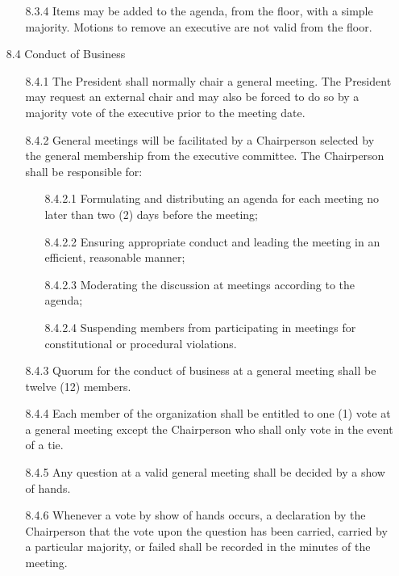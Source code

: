 \documentclass[12pt,a4paper]{article}
\begin{document}
\begin{enumerate}
\begin{enumerate}
\item[8.3.4] Items may be added to the agenda, from the floor, with a simple majority. Motions to remove an executive are not valid from the floor.
\end{enumerate}

\item[8.4] Conduct of Business

\begin{enumerate}
\item[8.4.1] The President shall normally chair a general meeting. The President may request an external chair and may also be forced to do so by a majority vote of the executive prior to the meeting date.  

\item[8.4.2] General meetings will be facilitated by a Chairperson selected by the general membership from the executive committee.
The Chairperson shall be responsible for:

\begin{enumerate}
\item[8.4.2.1] Formulating and distributing an agenda for each meeting no later than two (2) days before the meeting;

\item[8.4.2.2] Ensuring appropriate conduct and leading the meeting in an efficient, reasonable manner;

\item[8.4.2.3] Moderating the discussion at meetings according to the agenda;

\item[8.4.2.4] Suspending members from participating in meetings for constitutional or procedural violations.
\end{enumerate}

\item[8.4.3] Quorum for the conduct of business at a general meeting shall be twelve (12) members.

\item[8.4.4] Each member of the organization shall be entitled to one (1) vote at a general meeting except the
Chairperson who shall only vote in the event of a tie.

\item[8.4.5] Any question at a valid general meeting shall be decided by a show of hands.

\item[8.4.6] Whenever a vote by show of hands occurs, a declaration by the Chairperson that the vote upon the question has been carried, carried by a particular majority, or failed shall be recorded in the minutes of the meeting.


\end{enumerate}
\end{enumerate}
\end{document}
